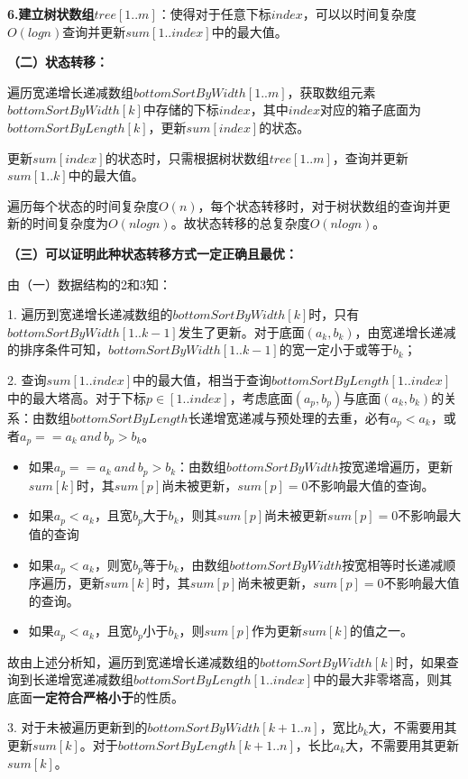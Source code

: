 \documentclass{article}
\begin{document}
\textbf{6.建立树状数组$tree[1..m]$}：使得对于任意下标$index$，可以以时间复杂度$O(logn)$查询并更新$sum[1..index]$中的最大值。


\textbf{（二）状态转移：}

遍历宽递增长递减数组$bottomSortByWidth[1..m]$，获取数组元素$bottomSortByWidth[k]$中存储的下标$index$，其中$index$对应的箱子底面为$bottomSortByLength[k]$，更新$sum[index]$的状态。

更新$sum[index]$的状态时，只需根据树状数组$tree[1..m]$，查询并更新$sum[1..k]$中的最大值。

遍历每个状态的时间复杂度$O(n)$，每个状态转移时，对于树状数组的查询并更新的时间复杂度为$O(nlogn)$。故状态转移的总复杂度$O(nlogn)$。

\textbf{（三）可以证明此种状态转移方式一定正确且最优：}

由（一）数据结构的2和3知：

1. 遍历到宽递增长递减数组的$bottomSortByWidth[k]$时，只有$bottomSortByWidth[1..k-1]$发生了更新。对于底面$(a_k,b_k)$，由宽递增长递减的排序条件可知，$bottomSortByWidth[1..k-1]$的宽一定小于或等于$b_k$；

2. 查询$sum[1..index]$中的最大值，相当于查询$bottomSortByLength[1..index]$中的最大塔高。对于下标$p\in [1..index]$，考虑底面$(a_p,b_p)$与底面$(a_k,b_k)$的关系：由数组$bottomSortByLength$长递增宽递减与预处理的去重，必有$a_p<a_k$，或者$a_p==a_k\ and\  b_p>b_k$。

\begin{itemize}
    \item  如果$a_p==a_k\ and\ b_p>b_k$：由数组$bottomSortByWidth$按宽递增遍历，更新$sum[k]$时，其$sum[p]$尚未被更新，$sum[p]=0$不影响最大值的查询。
    \item  如果$a_p<a_k$，且宽$b_p$大于$b_k$，则其$sum[p]$尚未被更新$sum[p]=0$不影响最大值的查询
    \item  如果$a_p<a_k$，则宽$b_p$等于$b_k$，由数组$bottomSortByWidth$按宽相等时长递减顺序遍历，更新$sum[k]$时，其$sum[p]$尚未被更新，$sum[p]=0$不影响最大值的查询。
    \item  如果$a_p<a_k$，且宽$b_p$小于$b_k$，则$sum[p]$作为更新$sum[k]$的值之一。
\end{itemize}

故由上述分析知，遍历到宽递增长递减数组的$bottomSortByWidth[k]$时，如果查询到长递增宽递减数组$bottomSortByLength[1..index]$中的最大非零塔高，则其底面\textbf{一定符合严格小于}的性质。

3. 对于未被遍历更新到的$bottomSortByWidth[k+1..n]$，宽比$b_k$大，不需要用其更新$sum[k]$。对于$bottomSortByLength[k+1..n]$，长比$a_k$大，不需要用其更新$sum[k]$。
\end{document}
